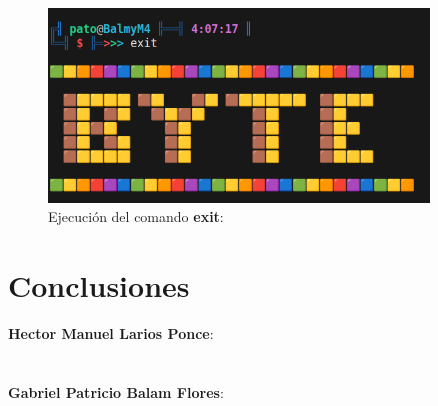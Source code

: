 \documentclass[titlepage]{article}
\begin{document}
\begin{figure}[H]
    \centering
    \includegraphics[width=0.9\textwidth]{exit.png}
    \caption{Ejecución del comando \textbf{exit}:}
    \label{fig:ejemplo}
\end{figure}
 

\newpage
\section{Conclusiones}
\textbf{Hector Manuel Larios Ponce}:\\
\\\\

\textbf{Gabriel Patricio Balam Flores}:\\
\end{document}
